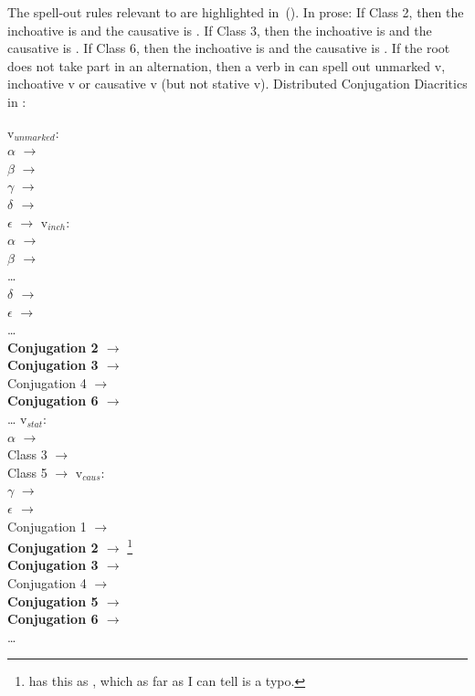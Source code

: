 The spell-out rules relevant to {\thif} are highlighted in~(\nextx). In prose: If Class 2, then the inchoative is {\tkal} and the causative is {\thif}. If Class 3, then the inchoative is {\tnif} and the causative is {\thif}. If Class 6, then the inchoative is {\thif} and the causative is {\thif}. If the root does not take part in an alternation, then a verb in {\thit} can spell out unmarked v, inchoative v or causative v (but not stative v).
\pex Distributed Conjugation Diacritics in \citet[230]{arad05}: \label{ex:arad-classes2}
\begin{multicols}{2}
	\a  v$_{unmarked}$:\\
			$\alpha$ $\rightarrow$ {\tkal}\\
			$\beta$ $\rightarrow$ {\tnif}\\
			$\gamma$ $\rightarrow$ {\tpie}\\
			\textbf{$\delta$ $\rightarrow$ {\thif}}\\
			$\epsilon$ $\rightarrow$ {\thit}
	\a v$_{inch}$:\\
			$\alpha$ $\rightarrow$ {\tkal}\\
			\textbf{$\beta$ $\rightarrow$ {\tnif}} \\
			\dots \\
			\textbf{$\delta$ $\rightarrow$ {\thif}}\\
			$\epsilon$ $\rightarrow$ {\thit}\\
			\dots \\
			\textbf{Conjugation 2 $\rightarrow$ {\tkal}}\\
			\textbf{Conjugation 3 $\rightarrow$ {\tnif}}\\
			Conjugation 4 $\rightarrow$ {\thit}\\
			\textbf{Conjugation 6 $\rightarrow$ {\thif}}\\
			\dots
		\columnbreak
	\a v$_{stat}$:\\
			$\alpha$ $\rightarrow$ {\tkal}\\
			Class 3 $\rightarrow$ {\tkal}\\
			Class 5 $\rightarrow$ {\tkal}
	\a v$_{caus}$:\\
			$\gamma$ $\rightarrow$ {\tpie}\\
			\textbf{$\epsilon$ $\rightarrow$ {\thif}}\\
			Conjugation 1 $\rightarrow$ {\tkal}\\
			\textbf{Conjugation 2 $\rightarrow$ {\thif}}\footnote{\citet[231]{arad05} has this as {\tnif}, which as far as I can tell is a typo.}\\
			\textbf{Conjugation 3 $\rightarrow$ {\thif}}\\
			Conjugation 4 $\rightarrow$ {\tpie}\\
			\textbf{Conjugation 5 $\rightarrow$ {\thif}}\\
			\textbf{Conjugation 6 $\rightarrow$ {\thif}}\\
			\dots
	\end{multicols}
\xe

